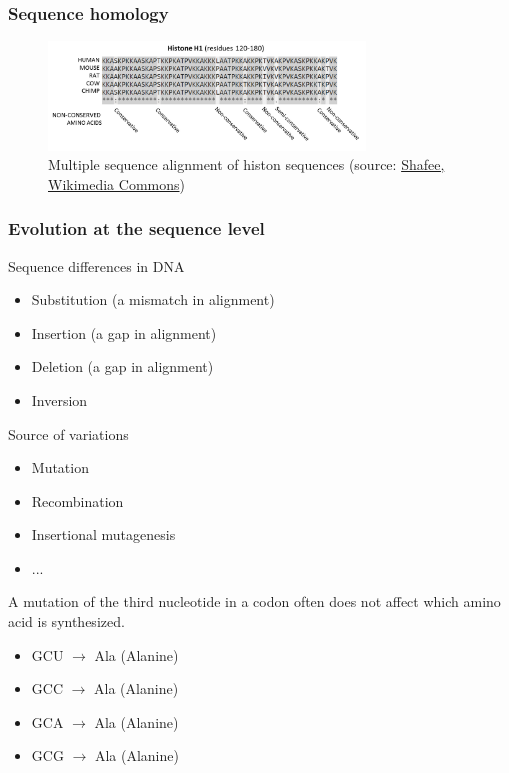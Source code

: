 %
%
\subsubsection*{Sequence homology}
\begin{figure}[H]
  \centering
      \includegraphics[width=0.75\textwidth]{fig03/histone_alignment.png}
  \caption{Multiple sequence alignment of histon sequences \newline (source: \href{https://commons.wikimedia.org/w/index.php?curid=37188728}{Shafee, Wikimedia Commons})}
\end{figure}

%
%
\subsubsection*{Evolution at the sequence level}
Sequence differences in DNA
\begin{itemize}
\item Substitution (a mismatch in alignment)
\item Insertion (a gap in alignment)
\item Deletion (a gap in alignment)
\item Inversion
\end{itemize}

\noindent
Source of variations
\begin{itemize}
\item Mutation
\item Recombination
\item Insertional mutagenesis
\item ...
\end{itemize}

\noindent
A mutation of the third nucleotide in a codon often does not affect which amino acid is synthesized.
\begin{itemize}
\item GCU $\rightarrow$ Ala (Alanine)
\item GCC $\rightarrow$ Ala (Alanine)
\item GCA $\rightarrow$ Ala (Alanine)
\item GCG $\rightarrow$ Ala (Alanine)
\end{itemize}


